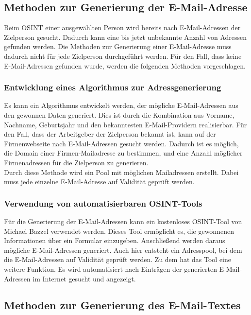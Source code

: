 	\subsection{Methoden zur Generierung der E-Mail-Adresse}
	
	Beim OSINT einer ausgewählten Person wird bereits nach E-Mail-Adressen der Zielperson gesucht. Dadurch kann eine bis jetzt unbekannte Anzahl von Adressen gefunden werden. Die Methoden zur Generierung einer E-Mail-Adresse muss dadurch nicht für jede Zielperson durchgeführt werden. Für den Fall, dass keine E-Mail-Adressen gefunden wurde, werden die folgenden Methoden vorgeschlagen.
	
		\subsubsection{Entwicklung eines Algorithmus zur Adressgenerierung}
		Es kann ein Algorithmus entwickelt werden, der mögliche E-Mail-Adressen aus den gewonnen Daten generiert. Dies ist durch die Kombination aus Vorname, Nachname, Geburtsjahr und den bekanntesten E-Mail-Providern realisierbar. Für den Fall, dass der Arbeitgeber der Zielperson bekannt ist, kann auf der Firmenwebseite nach E-Mail-Adressen gesucht werden. Dadurch ist es möglich, die Domain einer Firmen-Mailadresse zu bestimmen, und eine Anzahl möglicher Firmenadressen für die Zielperson zu generieren.\\
		Durch diese Methode wird ein Pool mit möglichen Mailadressen erstellt. Dabei muss jede einzelne E-Mail-Adresse auf Validität geprüft werden.

		
		\subsubsection{Verwendung von automatisierbaren OSINT-Tools}
		Für die Generierung der E-Mail-Adressen kann ein kostenloses OSINT-Tool von Michael Bazzel verwendet werden. Dieses Tool ermöglicht es, die gewonnenen Informationen über ein Formular einzugeben. Anschließend werden daraus mögliche E-Mail-Adressen generiert. Auch hier entsteht ein Adresspool, bei dem die E-Mail-Adressen auf Validität geprüft werden. Zu dem hat das Tool eine weitere Funktion. Es wird automatisiert nach Einträgen der generierten E-Mail-Adressen im Internet gesucht und angezeigt. \cite{EmailAssumptions}
		
	\subsection{Methoden zur Generierung des E-Mail-Textes}
